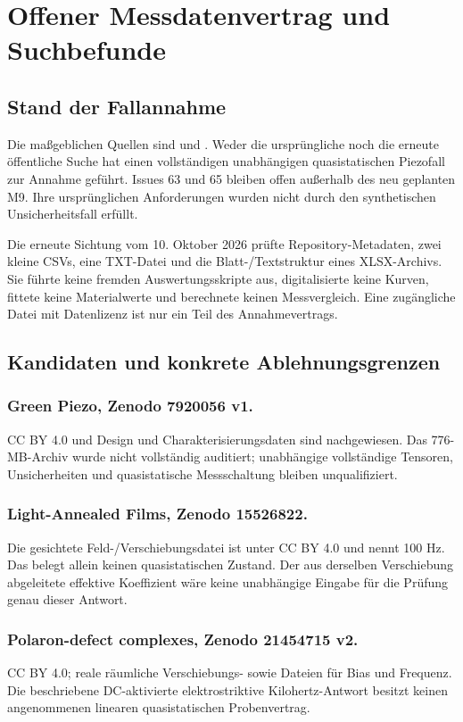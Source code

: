 \chapter{Offener Messdatenvertrag und Suchbefunde}
\section{Stand der Fallannahme}
Die maßgeblichen Quellen sind  und
. Weder die ursprüngliche
noch die erneute öffentliche Suche hat einen vollständigen unabhängigen
quasistatischen Piezofall zur Annahme geführt. Issues 63 und 65 bleiben offen
außerhalb des neu geplanten M9. Ihre ursprünglichen Anforderungen wurden
nicht durch den synthetischen Unsicherheitsfall erfüllt.

Die erneute Sichtung vom 10. Oktober 2026 prüfte Repository-Metadaten,
zwei kleine CSVs, eine TXT-Datei und die Blatt-/Textstruktur eines XLSX-Archivs.
Sie führte keine fremden Auswertungsskripte aus, digitalisierte keine Kurven,
fittete keine Materialwerte und berechnete keinen Messvergleich. Eine
zugängliche Datei mit Datenlizenz ist nur ein Teil des Annahmevertrags.

\section{Kandidaten und konkrete Ablehnungsgrenzen}
\subsection*{Green Piezo, Zenodo 7920056 v1.}
CC BY 4.0 und Design und Charakterisierungsdaten sind nachgewiesen.
Das 776-MB-Archiv wurde nicht vollständig auditiert; unabhängige vollständige
Tensoren, Unsicherheiten und quasistatische Messschaltung bleiben unqualifiziert.
\subsection*{Light-Annealed Films, Zenodo 15526822.}
Die gesichtete Feld-/Verschiebungsdatei ist unter CC BY 4.0 und nennt 100 Hz.
Das belegt allein keinen quasistatischen Zustand. Der aus derselben
Verschiebung abgeleitete effektive Koeffizient wäre keine unabhängige Eingabe
für die Prüfung genau dieser Antwort.
\subsection*{Polaron-defect complexes, Zenodo 21454715 v2.}
CC BY 4.0; reale räumliche Verschiebungs- sowie Dateien für Bias und Frequenz.
Die beschriebene DC-aktivierte elektrostriktive Kilohertz-Antwort besitzt
keinen angenommenen linearen quasistatischen Probenvertrag.
